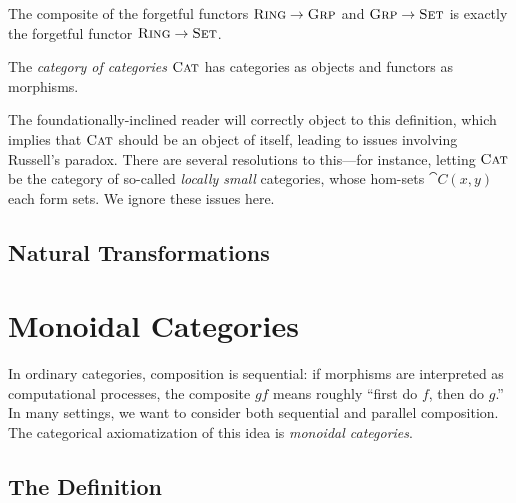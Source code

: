 \begin{ex}
  The composite of the forgetful functors ${\textsc{\text{Ring}}}\to{\textsc{\text{Grp}}}$ and
  ${\textsc{\text{Grp}}}\to{\textsc{\text{Set}}}$ is exactly the forgetful functor
  ${\textsc{\text{Ring}}}\to{\textsc{\text{Set}}}$.
\end{ex}

\begin{dfn}
  The \emph{category of categories} ${\textsc{\text{Cat}}}$ has categories as objects and
  functors as morphisms.
\end{dfn}

The foundationally-inclined reader will correctly object to this definition,
which implies that ${\textsc{\text{Cat}}}$ should be an object of itself, leading to issues
involving Russell's paradox. There are several resolutions to this---for
instance, letting ${\textsc{\text{Cat}}}$ be the category of so-called \emph{locally small}
categories, whose hom-sets $\cat{C}(x, y)$ each form sets. We ignore these
issues here.



\subsection{Natural Transformations}

\section{Monoidal Categories}

In ordinary categories, composition is sequential: if morphisms are interpreted
as computational processes, the composite $gf$ means roughly ``first do $f$,
then do $g$.'' In many settings, we want to consider both sequential and
parallel composition. The categorical axiomatization of this idea is
\emph{monoidal categories}.

\subsection{The Definition}

